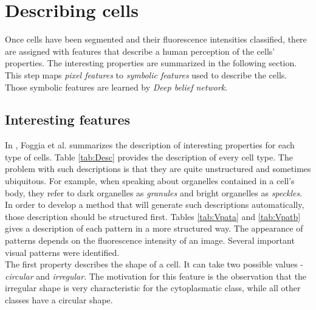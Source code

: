 
\chapter{Describing cells} %

\label{Chapter6} %


Once cells have been segmented and their fluorescence intensities classified, there are assigned with features that describe a human perception of the cells' properties. The interesting properties are summarized in the following section. \\

This step maps \textit{pixel features} to \textit{symbolic features} used to describe the cells. Those symbolic features are learned by \textit{Deep belief network}.



\section{Interesting features}

In \cite{FoggiaBenchmarks2013}, Foggia et al. summarizes the description of interesting properties for each type of cells. Table \ref{tab:Desc} provides the description of every cell type. The problem with such descriptions is that they are quite unstructured and sometimes ubiquitous. For example, when speaking about organelles contained in a cell's body, they refer to dark organelles as \textit{granules} and bright organelles as \textit{speckles}. \\

In order to develop a method that will generate such descriptions automatically, those description should be structured first. Tables \ref{tab:Vpata} and \ref{tab:Vpatb} gives a description of each pattern in a more structured way. The appearance of patterns depends on the fluorescence intensity of an image. Several important visual patterns were identified. \\

The first property describes the shape of a cell. It can take two possible values - \textit{circular} and \textit{irregular}. The motivation for this feature is the observation that the irregular shape is very characteristic for the cytoplasmatic class, while all other classes have a circular shape. \\

